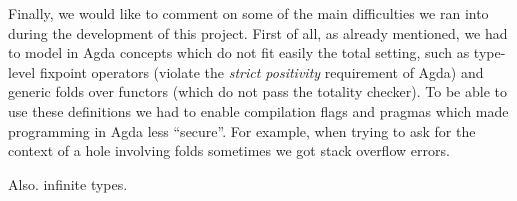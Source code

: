 \documentclass[a4paper]{article}
\begin{document}
        Finally, we would like to comment on some of the main difficulties we ran into during the
        development of this project. First of all, as already mentioned, we had to model in Agda concepts which
        do not fit easily the total setting, such as type-level fixpoint operators (violate the
        \emph{strict positivity} requirement of Agda) and generic folds over functors (which do not pass
        the totality checker). To be able to use these definitions we had to enable compilation flags and pragmas
        which made programming in Agda less ``secure''. For example, when trying to ask for the context of
        a hole involving folds sometimes we got stack overflow errors.

        Also. infinite types.



    
    
\end{document}
